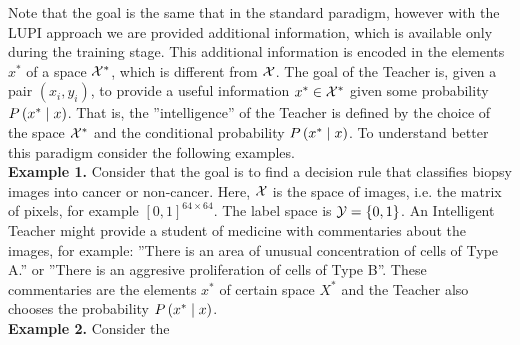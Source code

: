Note that the goal is the same that in the standard paradigm, however with the LUPI approach we are provided additional information, which is available only during the training stage. This additional information is encoded in the elements $x^*$ of a space $\mathcal{X}^*$, which is different from $\mathcal{X}$. The goal of the Teacher is, given a pair $(x_i, y_i)$, to provide a useful information $x^* \in \mathcal{X}^*$ given some probability $P\left( x^* \;\middle\vert\; x \right)$. That is, the ''intelligence'' of the Teacher is defined by the choice of the space $\mathcal{X}^*$ and the conditional probability $P\left( x^* \;\middle\vert\; x \right)$. 
To understand better this paradigm consider the following examples.
\\
\textbf{Example 1.} Consider that the goal is to find a decision rule that classifies biopsy images into cancer or non-cancer. Here, $\mathcal{X}$ is the space of images, i.e. the matrix of pixels, for example $[0, 1]^{64 \times 64}$. The label space is $\mathcal{Y} = \left\{0, 1\right\}$. An Intelligent Teacher might provide a student of medicine with commentaries about the images, for example: ''There is an area of unusual concentration of cells of Type A.'' or ''There is an aggresive proliferation of cells of Type B''. These commentaries are the elements $x^*$ of certain space $X^*$ and the Teacher also chooses the probability $P\left( x^* \;\middle\vert\; x \right)$.
\\
\textbf{Example 2.} Consider the  

